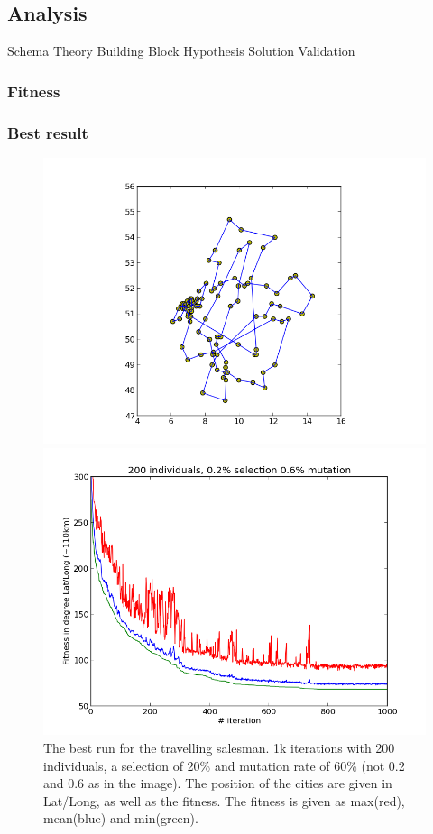 \documentclass{scrartcl}
\begin{document}
\subsection{Analysis}
Schema Theory
Building Block Hypothesis
Solution Validation

\subsubsection{Fitness}

\subsubsection{Best result}

\begin{figure}[H]
\centering
\begin{minipage}{.5\textwidth}
  \centering
  \includegraphics[width=.8\linewidth]{img/ex3/68,46-1-1000-200-0,2-0,6.png}
\end{minipage}%
\begin{minipage}{.5\textwidth}
  \centering
  \includegraphics[width=.8\linewidth]{img/ex3/68,46-1-1000-200-0,2-0,6-fitness.png}
\end{minipage}
\caption{The best run for the travelling salesman. 1k iterations with 200 individuals, a selection of 20\% and mutation rate of 60\% (not 0.2 and 0.6 as in the image). The position of the cities are given in Lat/Long, as well as the fitness. The fitness is given as max(red), mean(blue) and min(green).}
\label{fig:}
\end{figure}
\end{document}
